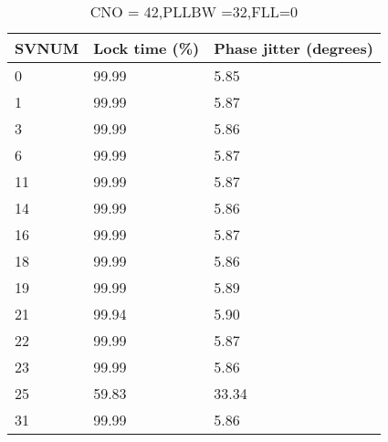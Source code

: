 \begin{table}[!htb]
\centering
\begin{tabular}{|l|l|l|}
\hline
\rowcolor[HTML]{C0C0C0} 
SVNUM & Lock time (\%) & Phase jitter (degrees) \\ \hline
0     & 99.99  & 5.85         \\ \hline
\rowcolor[HTML]{EFEFEF} 
1     & 99.99  & 5.87          \\ \hline
3     & 99.99  & 5.86          \\ \hline
\rowcolor[HTML]{EFEFEF} 
6     & 99.99  & 5.87          \\ \hline
11    & 99.99  & 5.87          \\ \hline
\rowcolor[HTML]{EFEFEF} 
14    & 99.99  & 5.86          \\ \hline
16    & 99.99  & 5.87          \\ \hline
\rowcolor[HTML]{EFEFEF} 
18    & 99.99  & 5.86          \\ \hline
19    & 99.99  & 5.89          \\ \hline
\rowcolor[HTML]{EFEFEF} 
21    & 99.94 & 5.90        \\ \hline
22    & 99.99  & 5.87        \\ \hline
\rowcolor[HTML]{EFEFEF} 
23    & 99.99  & 5.86          \\ \hline
25    & 59.83  & 33.34         \\ \hline
\rowcolor[HTML]{EFEFEF} 
31    & 99.99  & 5.86          \\ \hline
\end{tabular}
\caption{CNO = 42,PLLBW =32,FLL=0}
\label{my-label}
\end{table}


